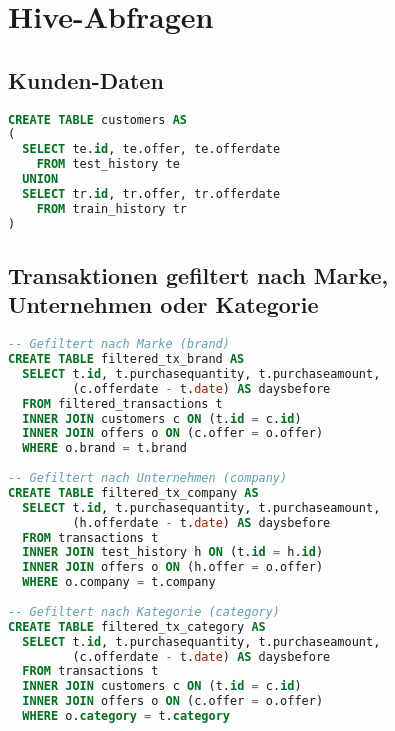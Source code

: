 \section{Hive-Abfragen}

\subsection{Kunden-Daten}
\begin{lstlisting}[language=SQL]
CREATE TABLE customers AS 
(
  SELECT te.id, te.offer, te.offerdate
    FROM test_history te
  UNION
  SELECT tr.id, tr.offer, tr.offerdate
    FROM train_history tr 
)
\end{lstlisting}

\subsection{Transaktionen gefiltert nach Marke, Unternehmen oder Kategorie}
\label{sql:filtered_tx}
\begin{lstlisting}[language=SQL]
-- Gefiltert nach Marke (brand)
CREATE TABLE filtered_tx_brand AS
  SELECT t.id, t.purchasequantity, t.purchaseamount, 
         (c.offerdate - t.date) AS daysbefore 
  FROM filtered_transactions t 
  INNER JOIN customers c ON (t.id = c.id)
  INNER JOIN offers o ON (c.offer = o.offer)
  WHERE o.brand = t.brand
  
-- Gefiltert nach Unternehmen (company)
CREATE TABLE filtered_tx_company AS
  SELECT t.id, t.purchasequantity, t.purchaseamount, 
         (h.offerdate - t.date) AS daysbefore 
  FROM transactions t 
  INNER JOIN test_history h ON (t.id = h.id)
  INNER JOIN offers o ON (h.offer = o.offer)
  WHERE o.company = t.company
  
-- Gefiltert nach Kategorie (category)
CREATE TABLE filtered_tx_category AS
  SELECT t.id, t.purchasequantity, t.purchaseamount, 
         (c.offerdate - t.date) AS daysbefore 
  FROM transactions t 
  INNER JOIN customers c ON (t.id = c.id)
  INNER JOIN offers o ON (c.offer = o.offer)
  WHERE o.category = t.category
\end{lstlisting}

